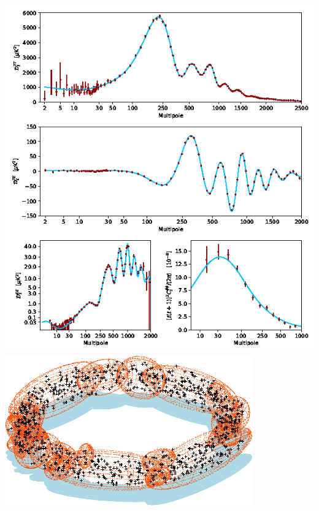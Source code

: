 \documentclass[aspectratio=169]{beamer}
\begin{document}
\begin{frame}
\begin{columns}
        \begin{columns}
        \includegraphics[width=\textwidth]{figures/coadded}%
        \includegraphics[width=\textwidth]{figures/multinest}%


\end{columns}
\end{columns}
\end{frame}
\end{document}
